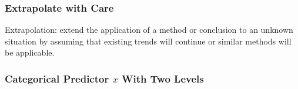 \documentclass[slides]{beamer}
\newcommand{\blue}[1]{\textcolor{blue2}{#1}}
\begin{document}
\begin{frame}[fragile]
\frametitle{Extrapolate with Care}
\blue{Extrapolation}:  extend the application of a method or conclusion to an unknown situation by assuming that existing trends will continue or similar methods will be applicable.

%
%
%

\end{frame}


\begin{frame}[fragile]
\frametitle{Categorical Predictor $x$ With Two Levels}

%
%
%

\end{frame}
\end{document}
